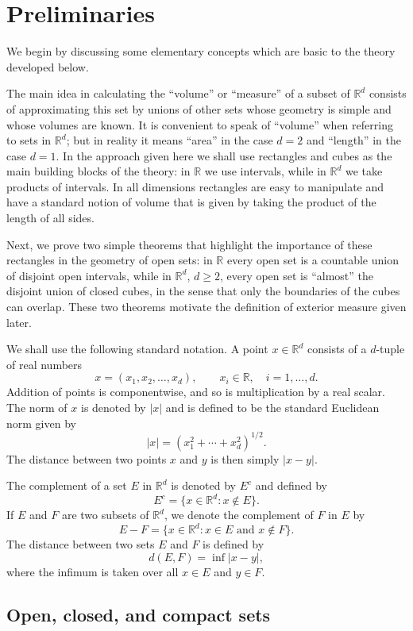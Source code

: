 \documentclass[11pt,openany]{book}
\begin{document}
\section{Preliminaries}

We begin by discussing some elementary concepts which are basic to the theory developed below.

The main idea in calculating the ``volume'' or ``measure'' of a subset of $\mathbb{R}^d$ consists of approximating this set by unions of other sets whose geometry is simple and whose volumes are known. It is convenient to speak of ``volume'' when referring to sets in $\mathbb{R}^d$; but in reality it means ``area'' in the case $d=2$ and ``length'' in the case $d=1$. In the approach given here we shall use rectangles and cubes as the main building blocks of the theory: in $\mathbb{R}$ we use intervals, while in $\mathbb{R}^d$ we take products of intervals. In all dimensions rectangles are easy to manipulate and have a standard notion of volume that is given by taking the product of the length of all sides.

Next, we prove two simple theorems that highlight the importance of these rectangles in the geometry of open sets: in $\mathbb{R}$ every open set is a countable union of disjoint open intervals, while in $\mathbb{R}^d$, $d\ge 2$, every open set is ``almost'' the disjoint union of closed cubes, in the sense that only the boundaries of the cubes can overlap. These two theorems motivate the definition of exterior measure given later.

We shall use the following standard notation. A point $x\in\mathbb{R}^d$ consists of a $d$-tuple of real numbers
\[
 x=(x_1,x_2,\ldots,x_d),\qquad x_i\in\mathbb{R},\quad i=1,\ldots,d.
\]
Addition of points is componentwise, and so is multiplication by a real scalar. The norm of $x$ is denoted by $|x|$ and is defined to be the standard Euclidean norm given by
\[
 |x|=(x_1^2+\cdots+x_d^2)^{1/2}.
\]
The distance between two points $x$ and $y$ is then simply $|x-y|$.

The complement of a set $E$ in $\mathbb{R}^d$ is denoted by $E^c$ and defined by
\[
 E^c=\{x\in\mathbb{R}^d:x\notin E\}.
\]
If $E$ and $F$ are two subsets of $\mathbb{R}^d$, we denote the complement of $F$ in $E$ by
\[
 E-F=\{x\in\mathbb{R}^d:x\in E\text{ and }x\notin F\}.
\]
The distance between two sets $E$ and $F$ is defined by
\[
 d(E,F)=\inf |x-y|,
\]
where the infimum is taken over all $x\in E$ and $y\in F$.

\subsection*{Open, closed, and compact sets}
\end{document}
